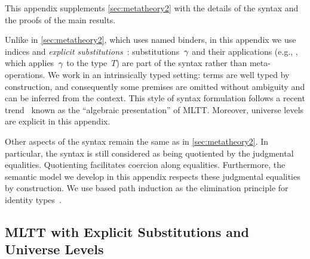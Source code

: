 This appendix supplements \cref{sec:metatheory2} with the details of the syntax
and the proofs of the main results.

Unlike in \cref{sec:metatheory2}, which uses named binders, in this appendix we
use \citeauthor{debruijn1964} indices and \emph{explicit
substitutions}~\cite{abadi1989subst,substcalculus}:
substitutions~$\gamma$ and their applications (e.g., , which
applies~$\gamma$ to the type~$T$) are part of the syntax rather than
meta-operations.
We work in an intrinsically typed setting: terms are well typed by construction, 
%
and consequently some premises are omitted without ambiguity and can be inferred from the context. 
% 
This style of syntax formulation follows a recent
trend~\cite{altkap2016,coquand2018canonicity,gratzer-sterling-birkedal-2019}
known as the ``algebraic presentation'' of MLTT.
Moreover, universe levels are explicit in this appendix. 


Other aspects of the syntax remain the same as in \cref{sec:metatheory2}.
In particular,
the syntax is still considered as being quotiented by the judgmental equalities.
Quotienting facilitates coercion along equalities.
Furthermore, the semantic model we develop in this appendix respects these
judgmental equalities by construction.
We use based path induction
as the elimination principle for identity types~\cite{program2013homotopy}.



\subsection{MLTT with Explicit Substitutions and Universe Levels}
\label{sec:mltt-full}

